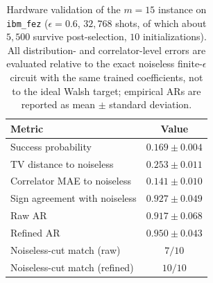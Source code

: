 \begin{table}[H]
\centering
\caption{Hardware validation of the $m=15$ instance on \texttt{ibm\_fez} ($\epsilon=0.6$, $32{,}768$ shots, of which about $5{,}500$ survive post-selection, $10$ initializations). All distribution- and correlator-level errors are evaluated relative to the exact noiseless finite-$\epsilon$ circuit with the same trained coefficients, not to the ideal Walsh target; empirical ARs are reported as mean $\pm$ standard deviation.}
\label{tab:hardware}
\begin{tabular}{lc}
\toprule
Metric & Value \\
\midrule
Success probability & $0.169 \pm 0.004$ \\
TV distance to noiseless & $0.253 \pm 0.011$ \\
Correlator MAE to noiseless & $0.141 \pm 0.010$ \\
Sign agreement with noiseless & $0.927 \pm 0.049$ \\
Raw AR & $0.917 \pm 0.068$ \\
Refined AR & $0.950 \pm 0.043$ \\
Noiseless-cut match (raw) & $7/10$ \\
Noiseless-cut match (refined) & $10/10$ \\
\bottomrule
\end{tabular}
\end{table}
